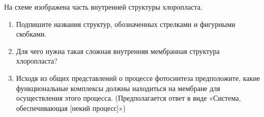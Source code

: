 
На схеме изображена часть внутренней структуры хлоропласта.


\begin{enumerate}
    \item Подпишите названия структур, обозначенных стрелками и фигурными скобками.
    \item Для чего нужна такая сложная внутренняя мембранная структура хлоропласта?
    \item Исходя из общих представлений о процессе фотосинтеза предположите, какие функциональные комплексы должны находиться на 
    мембране для осуществления этого процесса. (Предполагается ответ в виде «Система, обеспечивающая [некий процесс]»)
\end{enumerate}